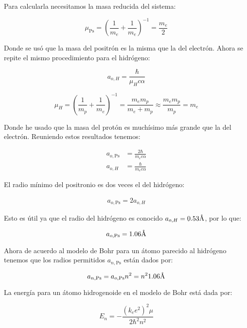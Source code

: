 \documentclass[12pt]{article}
\newcommand{\angstrom}{\mbox{\normalfont\AA}}
\begin{document}
Para calcularla necesitamos la masa reducida del sistema:

\begin{equation}
\mu_{\text{Ps}} = \left(\frac{1}{m_e}+\frac{1}{m_e} \right)^{-1} = \frac{m_e}{2}
\end{equation}

Donde se usó que la masa del positrón es la misma que la del electrón. Ahora se repite el mismo procedimiento para el hidrógeno:

\begin{equation}
a_{o,H} = \frac{\hbar}{\mu_{H} c \alpha}
\end{equation}


\begin{equation}
\mu_{H} = \left(\frac{1}{m_p}+\frac{1}{m_e} \right)^{-1} = \frac{m_e m_p}{m_e+ m_p} \approx \frac{m_e m_p}{m_p} = m_e 
\end{equation}

Donde he usado que la masa del protón es muchísimo más grande que la del electrón. Reuniendo estos resultados tenemos:

\begin{align*}
a_{o,\text{Ps}} &= \frac{2\hbar}{m_e c \alpha}\\
a_{o,H} &= \frac{\hbar}{m_e  c \alpha}
\end{align*}

El radio mínimo del positronio es dos veces el del hidrógeno:

\begin{align*}
a_{o,\text{Ps}} = 2 a_{o,H} 
\end{align*}

Esto es útil ya que el radio del hidrógeno es conocido $a_{o,H} = 0.53 \angstrom$, por lo que:

\begin{align*}
a_{o,\text{Ps}} = 1.06 \angstrom
\end{align*}

Ahora de acuerdo al modelo de Bohr para un átomo parecido al hidrógeno tenemos que los radios permitidos $a_{n,\text{Ps}}$ están dados por:

\begin{equation}
a_{n,\text{Ps}} = a_{o,\text{Ps}} n^2 = n^2  1.06 \angstrom
\end{equation}

La energía para un átomo hidrogenoide en el modelo de Bohr está dada por:

\begin{equation}
E_n = -\frac{(k_e e^2)^2 \mu }{2 \hbar^2 n^2}
\end{equation}
\end{document}
